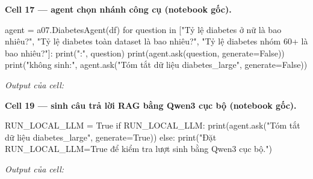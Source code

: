 \documentclass[12pt,a4paper]{report}
\begin{document}
\par\medskip\noindent\textbf{Cell 17 --- agent chọn nhánh công cụ (notebook gốc).}
\begin{NotebookCode}
agent = a07.DiabetesAgent(df)
for question in ["Tỷ lệ diabetes ở nữ là bao nhiêu?", "Tỷ lệ diabetes toàn dataset là bao nhiêu?", "Tỷ lệ diabetes nhóm 60+ là bao nhiêu?"]:
    print(":", question)
    print(agent.ask(question, generate=False))
print("\nRAG không sinh:", agent.ask("Tóm tắt dữ liệu diabetes_large", generate=False))
\end{NotebookCode}
\noindent\textit{Output của cell:}

\par\medskip\noindent\textbf{Cell 19 --- sinh câu trả lời RAG bằng Qwen3 cục bộ (notebook gốc).}
\begin{NotebookCode}
RUN_LOCAL_LLM = True
if RUN_LOCAL_LLM:
    print(agent.ask("Tóm tắt dữ liệu diabetes_large", generate=True))
else:
    print("Đặt RUN_LOCAL_LLM=True để kiểm tra lượt sinh bằng Qwen3 cục bộ.")
\end{NotebookCode}
\noindent\textit{Output của cell:}
\end{document}
